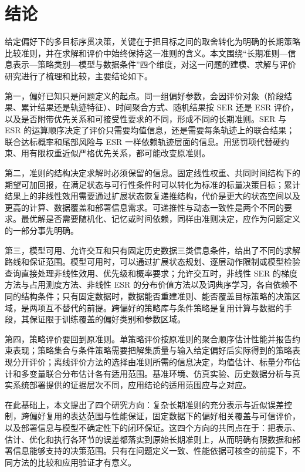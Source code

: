 \section{结论}\label{sec:conclusion}

给定偏好下的多目标序贯决策，关键在于把目标之间的取舍转化为明确的长期策略比较准则，并在求解和评价中始终保持这一准则的含义。本文围绕“长期准则---信息表示---策略类别---模型与数据条件”四个维度，对这一问题的建模、求解与评价研究进行了梳理和比较，主要结论如下。

第一，偏好已知只是问题定义的起点。同一组偏好参数，会因评价对象（阶段结果、累计结果还是轨迹特征）、时间聚合方式、随机结果按 SER 还是 ESR 评价，以及是否附带优先关系和可接受性要求的不同，形成不同的长期准则。SER 与 ESR 的运算顺序决定了评价只需要均值信息，还是需要每条轨迹上的联合结果；联合达标概率和尾部风险与 ESR 一样依赖轨迹层面的信息。用惩罚项代替硬约束、用有限权重近似严格优先关系，都可能改变原准则。

第二，准则的结构决定求解时必须保留的信息。固定线性权重、共同时间结构下的期望可加回报，在满足状态与可行性条件时可以转化为标准的标量决策目标；累计结果上的非线性效用需要通过扩展状态恢复递推结构，代价是更大的状态空间以及更高的计算、数据覆盖和部署信息需求。可递推性与动态一致性是两个不同的要求。最优解是否需要随机化、记忆或时间依赖，同样由准则决定，应作为问题定义的一部分事先明确。

第三，模型可用、允许交互和只有固定历史数据三类信息条件，给出了不同的求解路线和保证范围。模型可用时，可以通过扩展状态规划、逐层动作限制或模型检验查询直接处理非线性效用、优先级和概率要求；允许交互时，非线性 SER 的梯度方法与占用测度方法、非线性 ESR 的分布价值方法以及词典序学习，各自依赖不同的结构条件；只有固定数据时，数据能否重建准则、能否覆盖目标策略的决策区域，是两项互不替代的前提。跨偏好的策略库与条件策略是复用计算与数据的手段，其保证限于训练覆盖的偏好类别和参数区域。

第四，策略评价要回到原准则。单策略评价按原准则的聚合顺序估计性能并报告约束表现；策略集合与条件策略需要把解集质量与输入给定偏好后实际得到的策略表现分开评价；离线评价方法的选择由准则所需的信息决定，均值估计、标量分布估计和多变量联合分布估计各有适用范围。基准环境、仿真实验、历史数据分析与真实系统部署提供的证据层次不同，应用结论的适用范围应与之对应。

在此基础上，本文提出了四个研究方向：复杂长期准则的充分表示与近似误差控制，跨偏好复用的表达范围与性能保证，固定数据下的偏好相关覆盖与可信评价，以及部署信息与模型不确定性下的闭环保证。这四个方向的共同点在于：把表示、估计、优化和执行各环节的误差都落实到原始长期准则上，从而明确有限数据和部署信息能够支持的决策范围。只有在问题定义一致、性能依据可核查的前提下，不同方法的比较和应用验证才有意义。
